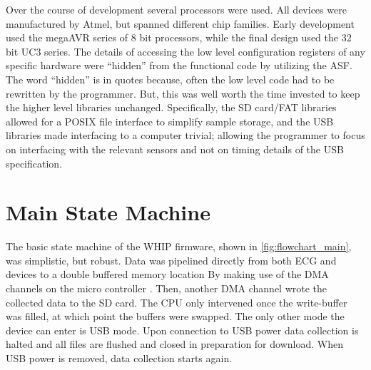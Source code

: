 Over the course of development several processors were used. All devices were manufactured by Atmel, but spanned different chip families. Early development used the megaAVR series of 8 bit processors, while the final design used the 32 bit UC3 series. The details of accessing the low level configuration registers of any specific hardware were ``hidden'' from the functional code by utilizing the ASF. The word ``hidden'' is in quotes because, often the low level code had to be rewritten by the programmer. But, this was well worth the time invested to keep the higher level libraries unchanged. Specifically, the SD card/FAT libraries allowed for a POSIX file interface to simplify sample storage, and the USB libraries made interfacing to a computer trivial; allowing the programmer to focus on interfacing with the relevant sensors and not on timing details of the USB specification.

\section{Main State Machine}

The basic state machine of the WHIP firmware, shown in \cref{fig:flowchart_main}, was simplistic, but robust. Data was pipelined directly from both ECG and  devices to a double buffered memory location By making use of the DMA channels on the micro controller . Then, another DMA channel wrote the collected data to the SD card. The CPU only intervened once the write-buffer was filled, at which point the buffers were swapped. The only other mode the device can enter is USB mode. Upon connection to USB power data collection is halted and all files are flushed and closed in preparation for download. When USB power is removed, data collection starts again. 

